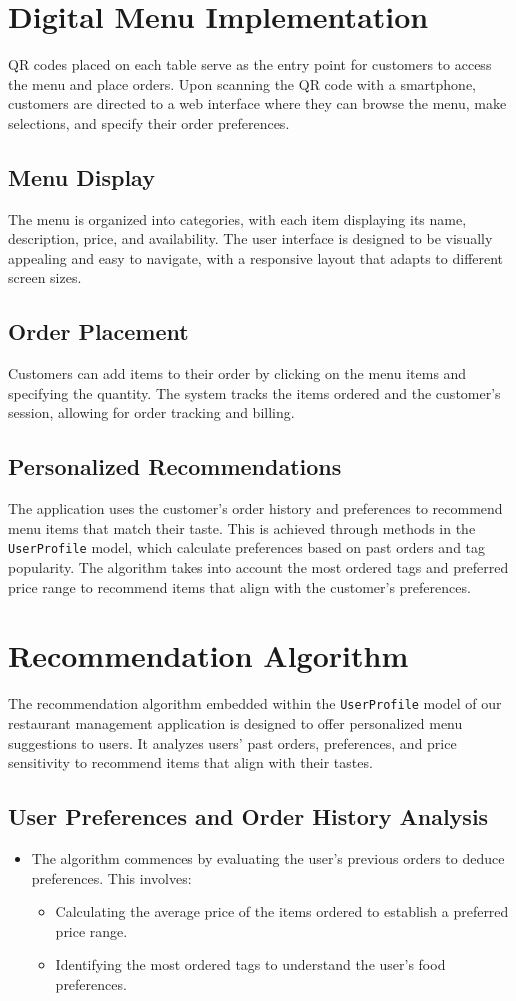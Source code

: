 \section {Digital Menu Implementation}
QR codes placed on each table serve as the entry point for customers to access the menu and place orders. Upon scanning the QR code with a smartphone, customers are directed to a web interface where they can browse the menu, make selections, and specify their order preferences.
\subsection{Menu Display}
The menu is organized into categories, with each item displaying its name, description, price, and availability. The user interface is designed to be visually appealing and easy to navigate, with a responsive layout that adapts to different screen sizes.
\subsection{Order Placement}
Customers can add items to their order by clicking on the menu items and specifying the quantity. The system tracks the items ordered and the customer's session, allowing for order tracking and billing.
\subsection{Personalized Recommendations}
The application uses the customer's order history and preferences to recommend menu items that match their taste. This is achieved through methods in the \texttt{UserProfile} model, which calculate preferences based on past orders and tag popularity. The algorithm takes into account the most ordered tags and preferred price range to recommend items that align with the customer's preferences.

\section{Recommendation Algorithm}
The recommendation algorithm embedded within the \texttt{UserProfile} model of our restaurant management application is designed to offer personalized menu suggestions to users. It analyzes users' past orders, preferences, and price sensitivity to recommend items that align with their tastes.

\subsection{User Preferences and Order History Analysis}
\begin{itemize}
    \item The algorithm commences by evaluating the user's previous orders to deduce preferences. This involves:
    \begin{itemize}
        \item Calculating the average price of the items ordered to establish a preferred price range.
        \item Identifying the most ordered tags to understand the user's food preferences.
    \end{itemize}
\end{itemize}

